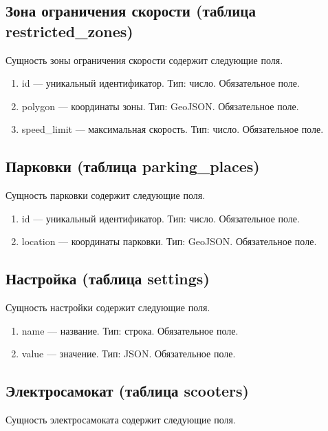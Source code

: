 \subsection{Зона ограничения скорости (таблица restricted\_zones)}

Сущность зоны ограничения скорости содержит следующие поля.

\begin{enumerate}
    \item id --- уникальный идентификатор. Тип: число. Обязательное поле.
    \item polygon --- координаты зоны. Тип: GeoJSON. Обязательное поле.
    \item speed\_limit --- максимальная скорость. Тип: число. Обязательное поле.
\end{enumerate}

\subsection{Парковки (таблица parking\_places)}

Сущность парковки содержит следующие поля.

\begin{enumerate}
    \item id --- уникальный идентификатор. Тип: число. Обязательное поле.
    \item location --- координаты парковки. Тип: GeoJSON. Обязательное поле.
\end{enumerate}

\subsection{Настройка (таблица settings)}

Сущность настройки содержит следующие поля.

\begin{enumerate}
    \item name --- название. Тип: строка. Обязательное поле.
    \item value --- значение. Тип: JSON. Обязательное поле.
\end{enumerate}

\subsection{Электросамокат (таблица scooters)}

Сущность электросамоката содержит следующие поля.

